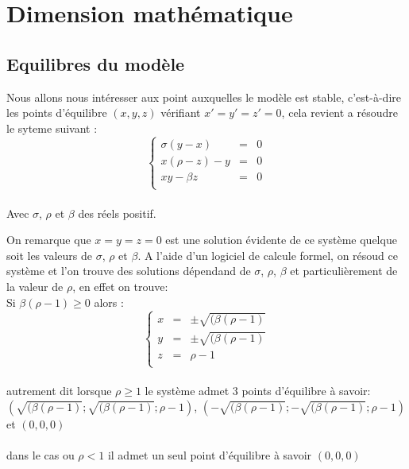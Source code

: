 \section{Dimension mathématique}

\subsection{Equilibres du modèle}
Nous allons nous intéresser aux point auxquelles le modèle est stable, c’est-à-dire les points d’équilibre $(x,y,z)$ vérifiant $x'=y'=z'=0$, cela revient a résoudre le syteme suivant :\\
\[
    \left\{
    \begin{array}{rcl}
        \sigma(y-x)&=&0\\
        x(\rho-z)-y&=&0\\
        xy-\beta z&=&0\\
    \end{array}
    \right.
\]\\

Avec $\sigma$, $\rho$ et $\beta$ des réels positif.

On remarque que $x=y=z=0$ est une solution évidente de ce système quelque soit les valeurs de $\sigma$, $\rho$ et $\beta$.
A l'aide d'un logiciel de calcule formel, on résoud ce système et l'on trouve des solutions dépendand de $\sigma$, $\rho$, $\beta$ et particulièrement de la valeur de $\rho$, en effet on trouve:\\

Si $\beta(\rho-1)\geq 0$ alors :
\[
    \left\{
    \begin{array}{rcl}
        x&=& \pm \sqrt{(\beta(\rho-1)}\\
        y&=& \pm \sqrt{(\beta(\rho-1)}\\
        z&=&\rho-1\\
    \end{array}
    \right.
\]\\
autrement dit lorsque $\rho\geq 1$ le système admet 3 points d'équilibre à savoir:\\
 $(\sqrt{(\beta(\rho-1)}; \sqrt{(\beta(\rho-1)}; \rho-1)$, $(-\sqrt{(\beta(\rho-1)}; -\sqrt{(\beta(\rho-1)}; \rho-1)$ et $(0,0,0)$\\\\
 dans le cas ou $\rho < 1$ il admet un seul point d'équilibre à savoir $(0,0,0)$\\
 
